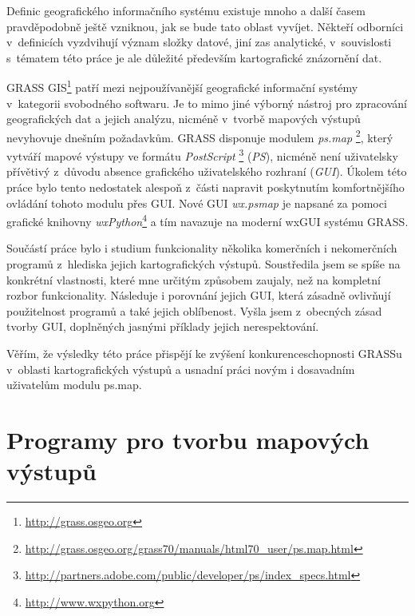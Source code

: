 \documentclass[a4paper,12pt,draft]{article}
\newcommand{\modul}[1]{\emph{#1}}
\begin{document}
Definic geografického informačního systému existuje mnoho
a další časem pravdě\-podobně ještě vzniknou, jak se bude tato oblast
vyvíjet. Někteří odborníci v~definicích vyzdvihují význam složky
datové, jiní zas analytické, v~souvislosti s~tématem této práce je
ale důležité především kartografické znázornění dat.


GRASS GIS\footnote{\url{http://grass.osgeo.org}} patří mezi nejpoužívanější
geografické informační
systémy v~kategorii svobodného softwaru. Je to mimo jiné výborný nástroj
pro zpracování geo\-grafických dat  a jejich analýzu, nicméně v~tvorbě mapových
výstupů nevyhovuje dnešním požadavkům. GRASS disponuje modulem \modul{ps.map}%
\footnote{\url{http://grass.osgeo.org/grass70/manuals/html70_user/ps.map.html}},
který
vytváří mapové výstupy ve formátu \emph{PostScript}%
\footnote{\url{http://partners.adobe.com/public/developer/ps/index_specs.html}}
 (\emph{PS}), nicméně není uživatelsky
přívětivý z~důvodu absence grafického uživatelského rozhraní (\emph{GUI}).
Úkolem této práce
bylo tento nedostatek alespoň z~části napravit  poskytnutím
komfortnějšího ovládání tohoto modulu přes GUI.
Nové GUI \emph{wx.psmap} je napsané za pomoci grafické knihovny
\emph{wxPython}\footnote{\url{http://www.wxpython.org}} a tím navazuje na
moderní wxGUI \cite{wxGUI_clanek} systému GRASS.


Součástí práce bylo i studium funkcionality několika komerčních i nekomerčních
programů z~hlediska jejich kartografických výstupů. Soustředila jsem se spíše
na konkrétní vlastnosti, které mne určitým způsobem zaujaly, než na kompletní
rozbor funkcionality. Následuje i porovnání jejich GUI, která
zásadně ovlivňují použitelnost programů a také jejich oblíbenost. Vyšla jsem
z~obecných zásad tvorby GUI, doplněných jasnými příklady jejich
nerespektování.


Věřím, že výsledky této práce přispějí ke zvýšení konkurenceschopnosti GRASSu
 v~oblasti kartografických výstupů a usnadní práci novým i dosavadním
uživatelům modulu ps.map.


\newpage
\section{Programy pro tvorbu mapových výstupů}
\end{document}
